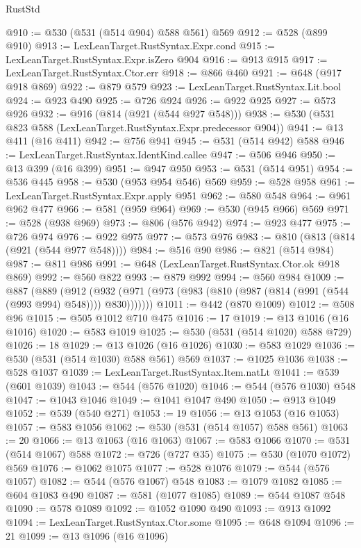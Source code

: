\begin{lexlean}{RustStd}
\begin{coremodule}
@910 := @530 (@531 (@514 @904) @588 @561) @569
@912 := @528 (@899 @910)
@913 := LexLeanTarget.RustSyntax.Expr.cond
@915 := LexLeanTarget.RustSyntax.Expr.isZero @904
@916 := @913 @915
@917 := LexLeanTarget.RustSyntax.Ctor.err
@918 := @866 @460
@921 := @648 (@917 @918 @869)
@922 := @879 @579
@923 := LexLeanTarget.RustSyntax.Lit.bool
@924 := @923 @490
@925 := @726 @924
@926 := @922 @925
@927 := @573 @926
@932 := @916 (@814 (@921 (@544 @927 @548)))
@938 := @530 (@531 @823 @588 (LexLeanTarget.RustSyntax.Expr.predecessor @904))
@941 := @13 @411 (@16 @411)
@942 := @756 @941
@945 := @531 (@514 @942) @588
@946 := LexLeanTarget.RustSyntax.IdentKind.callee
@947 := @506 @946
@950 := @13 @399 (@16 @399)
@951 := @947 @950
@953 := @531 (@514 @951)
@954 := @536 @445
@958 := @530 (@953 @954 @546) @569
@959 := @528 @958
@961 := LexLeanTarget.RustSyntax.Expr.apply @951
@962 := @580 @548
@964 := @961 @962 @477
@966 := @581 (@959 @964)
@969 := @530 (@945 @966) @569
@971 := @528 (@938 @969)
@973 := @806 (@576 @942)
@974 := @923 @477
@975 := @726 @974
@976 := @922 @975
@977 := @573 @976
@983 := @810 (@813 (@814 (@921 (@544 @977 @548))))
@984 := @516 @90
@986 := @821 (@514 @984)
@987 := @811 @986
@991 := @648 (LexLeanTarget.RustSyntax.Ctor.ok @918 @869)
@992 := @560 @822
@993 := @879 @992
@994 := @560 @984
@1009 := @887
    (@889
      (@912 (@932 (@971 (@973 (@983 (@810 (@987 (@814 (@991 (@544 (@993 @994) @548)))) @830)))))))
@1011 := @442 (@870 @1009)
@1012 := @508 @96
@1015 := @505 @1012 @710 @475
@1016 := 17
@1019 := @13 @1016 (@16 @1016)
@1020 := @583 @1019
@1025 := @530 (@531 (@514 @1020) @588 @729)
@1026 := 18
@1029 := @13 @1026 (@16 @1026)
@1030 := @583 @1029
@1036 := @530 (@531 (@514 @1030) @588 @561) @569
@1037 := @1025 @1036
@1038 := @528 @1037
@1039 := LexLeanTarget.RustSyntax.Item.natLt
@1041 := @539 (@601 @1039)
@1043 := @544 (@576 @1020)
@1046 := @544 (@576 @1030) @548
@1047 := @1043 @1046
@1049 := @1041 @1047 @490
@1050 := @913 @1049
@1052 := @539 (@540 @271)
@1053 := 19
@1056 := @13 @1053 (@16 @1053)
@1057 := @583 @1056
@1062 := @530 (@531 (@514 @1057) @588 @561)
@1063 := 20
@1066 := @13 @1063 (@16 @1063)
@1067 := @583 @1066
@1070 := @531 (@514 @1067) @588
@1072 := @726 (@727 @35)
@1075 := @530 (@1070 @1072) @569
@1076 := @1062 @1075
@1077 := @528 @1076
@1079 := @544 (@576 @1057)
@1082 := @544 (@576 @1067) @548
@1083 := @1079 @1082
@1085 := @604 @1083 @490
@1087 := @581 (@1077 @1085)
@1089 := @544 @1087 @548
@1090 := @578 @1089
@1092 := @1052 @1090 @490
@1093 := @913 @1092
@1094 := LexLeanTarget.RustSyntax.Ctor.some
@1095 := @648 @1094
@1096 := 21
@1099 := @13 @1096 (@16 @1096)

\end{coremodule}
\end{lexlean}
